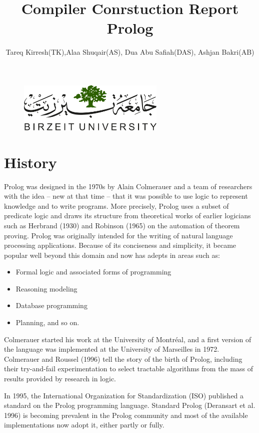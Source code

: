 \documentclass[14pt]{article}
\title{Compiler Conrstuction Report\\Prolog}
\author{Tareq Kirresh(TK),Alaa Shuqair(AS), Dua Abu Safiah(DAS), Ashjan Bakri(AB)}
\begin{document}
\begin{figure}
\centering
  \includegraphics[width=7cm]{LOGO.png}
\end{figure}
\maketitle
\newpage
\tableofcontents 
\newpage 
\section{History}

Prolog was designed in the 1970s by Alain Colmerauer and a team of researchers with the idea – new at that time – that it was possible to use logic to represent knowledge and to write programs. More precisely, Prolog uses a subset of predicate logic and draws its structure from theoretical works of earlier logicians such as Herbrand (1930) and Robinson (1965) on the automation of theorem proving. Prolog was originally intended for the writing of natural language processing applications. Because of its conciseness and simplicity, it became popular well beyond this domain and now has adepts in areas such as:
\begin{itemize}
\item Formal logic and associated forms of programming
\item Reasoning modeling
\item Database programming
\item Planning, and so on.
\end{itemize}
Colmerauer started his work at the University of Montréal, and a first 
version of the language was implemented at the University of Marseilles 
in 1972. Colmerauer and Roussel (1996) tell the story of the birth of Prolog, including their try-and-fail experimentation to select tractable algorithms from the mass of results provided by
research in logic.


In 1995, the International Organization for Standardization (ISO) published a
standard on the Prolog programming language. Standard Prolog (Deransart et al.
1996) is becoming prevalent in the Prolog community and most of the available implementations now adopt it, either partly or fully.
 
\end{document}
